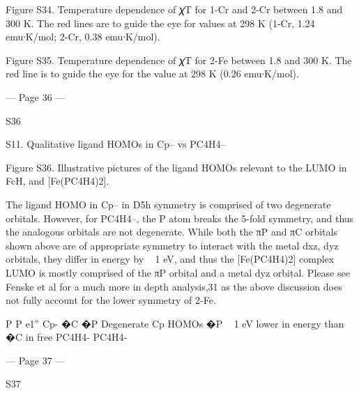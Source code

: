 Figure S34. Temperature dependence of 𝜒T for 1-Cr and 2-Cr between 1.8 and 300 K. The red lines are to guide 
the eye for values at 298 K (1-Cr, 1.24 emu∙K/mol; 2-Cr, 0.38 emu∙K/mol). 
 
Figure S35. Temperature dependence of 𝜒T for 2-Fe between 1.8 and 300 K. The red line is to guide the eye for 
the value at 298 K (0.26 emu∙K/mol). 
 


--- Page 36 ---
 
 
S36 
 
 
S11. Qualitative ligand HOMOs in Cp– vs {PC4H4}– 
 
Figure S36. Illustrative pictures of the ligand HOMOs relevant to the LUMO in FcH, and [Fe(PC4H4)2]. 
 
The ligand HOMO in Cp– in D5h symmetry is comprised of two degenerate orbitals. However, for {PC4H4}–, the P 
atom breaks the 5-fold symmetry, and thus the analogous orbitals are not degenerate. While both the πP and πC 
orbitals shown above are of appropriate symmetry to interact with the metal dxz, dyz orbitals, they differ in energy 
by ~ 1 eV, and thus the [Fe(PC4H4)2] complex LUMO is mostly comprised of the πP orbital and a metal dyz orbital. 
Please see Fenske et al for a much more in depth analysis,31 as the above discussion does not fully account for the 
lower symmetry of 2-Fe. 
 
 
P
P
e1''
Cp-
�C
�P
Degenerate Cp HOMOs
�P ~ 1 eV lower in energy than �C 
in free {PC4H4}-
{PC4H4}-


--- Page 37 ---
 
 
S37 
 

